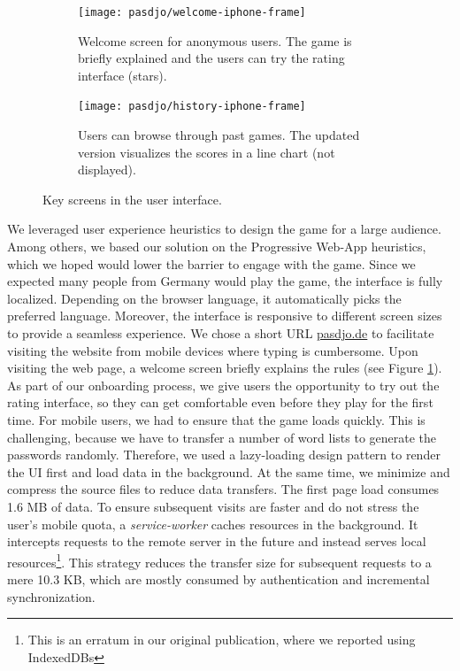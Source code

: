 \begin{figure}[!tbp]
	\centering
	\begin{subfigure}[t]{0.3\linewidth}
		\texttt{[image: pasdjo/welcome-iphone-frame]}
		\caption{\label{fig:pasdjo:welcome-screen}Welcome screen for anonymous users. The game is briefly explained and the users can try the rating interface (stars).}
	\end{subfigure}
	\hspace*{1cm}
	\begin{subfigure}[t]{0.3\linewidth}
		\texttt{[image: pasdjo/history-iphone-frame]}
		\caption{\label{fig:pasdjo:history-screen}Users can browse through past games. The updated version visualizes the scores in a line chart (not displayed).}
	\end{subfigure}
	\caption{\label{fig:pasdjo:welcome-history}Key screens in the user interface.}
\end{figure}

We leveraged user experience heuristics to design the game for a large audience. Among others, we based our solution on the Progressive Web-App heuristics, which we hoped would lower the barrier to engage with the game. Since we expected many people from Germany would play the game, the interface is fully localized. Depending on the browser language, it automatically picks the preferred language. Moreover, the interface is responsive to different screen sizes to provide a seamless experience. We chose a short URL \url{pasdjo.de} to facilitate visiting the website from mobile devices where typing is cumbersome. Upon visiting the web page, a welcome screen briefly explains the rules (see Figure \ref{fig:pasdjo:welcome-screen}). As part of our onboarding process, we give users the opportunity to try out the rating interface, so they can get comfortable even before they play for the first time. For mobile users, we had to ensure that the game loads quickly. This is challenging, because we have to transfer a number of word lists to generate the passwords randomly. Therefore, we used a lazy-loading design pattern to render the UI first and load data in the background. At the same time, we minimize and compress the source files to reduce data transfers. The first page load consumes 1.6 MB of data. To ensure subsequent visits are faster and do not stress the user's mobile quota, a \textit{service-worker} caches resources in the background. It intercepts requests to the remote server in the future and instead serves local resources\footnote{This is an erratum in our original publication, where we reported using IndexedDBs}. This strategy reduces the transfer size for subsequent requests to a mere 10.3 KB, which are mostly consumed by authentication and incremental synchronization. 

